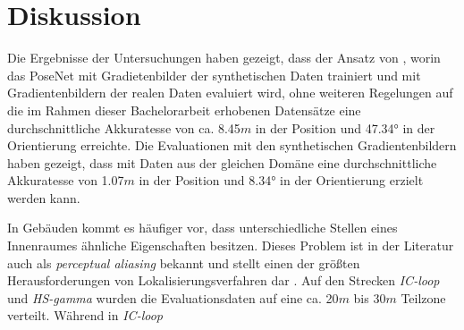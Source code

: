 
\section{Diskussion}
\label{sec:kapitel_5}

Die Ergebnisse der Untersuchungen haben gezeigt, dass der Ansatz von \citet{acharyaBIMPoseNetIndoorCamera2019}, worin das PoseNet mit Gradietenbilder der synthetischen Daten trainiert und mit Gradientenbildern der realen Daten evaluiert wird, ohne weiteren Regelungen auf die im Rahmen dieser Bachelorarbeit erhobenen Datensätze eine durchschnittliche Akkuratesse von ca. 8.45$m$ in der Position und 47.34° in der Orientierung erreichte. Die Evaluationen mit den synthetischen Gradientenbildern haben gezeigt, dass mit Daten aus der gleichen Domäne eine durchschnittliche Akkuratesse von 1.07$m$ in der Position und 8.34° in der Orientierung erzielt werden kann. 


In Gebäuden kommt es häufiger vor, dass unterschiedliche Stellen eines Innenraumes ähnliche Eigenschaften besitzen. Dieses Problem ist in der Literatur auch als \textit{perceptual aliasing} bekannt und stellt einen der größten Herausforderungen von Lokalisierungsverfahren\cite{lowryVisualPlaceRecognition2016} dar \cite{lowryVisualPlaceRecognition2016}.
Auf den Strecken \textit{IC-loop} und \textit{HS-gamma} wurden die Evaluationsdaten auf eine ca. 20$m$ bis 30$m$ Teilzone verteilt. Während in \textit{IC-loop} 


%



% 




